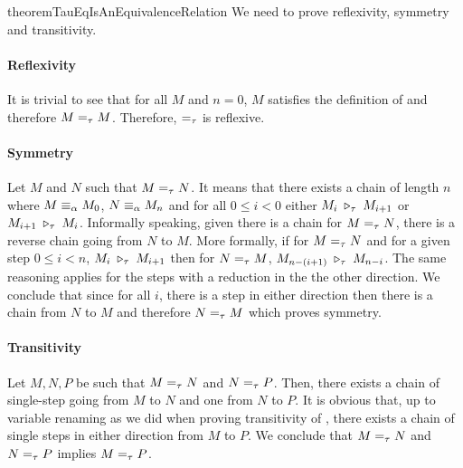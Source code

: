 \begin{longproof}{theoremTauEqIsAnEquivalenceRelation}
We need to prove reflexivity, symmetry and transitivity.

\paragraph{Reflexivity}
It is trivial to see that for all $M$ and $n=0$, $M$ satisfies the definition of \tauconversion and therefore $M =_\tau M$. Therefore, $=_\tau$ is reflexive.

\paragraph{Symmetry}
Let $M$ and $N$ such that $M =_\tau N$. It means that there exists a chain of length $n$ where $M \equiv_\alpha M_{0}$, $N \equiv_\alpha M_{n}$ and for all $0 \leq i < 0$ either $M_{i} \;\triangleright_\tau\; M_{i+1}$ or $M_{i+1} \;\triangleright_\tau\; M_{i}$. Informally speaking, given there is a chain for $M =_\tau N$, there is a reverse chain going from $N$ to $M$. More formally, if for $M =_\tau N$ and for a given step $0 \leq i < n$, $M_i \;\triangleright_\tau\; M_{i+1}$ then for $N =_\tau M$, $M_{n-(i+1)} \;\triangleright_\tau\; M_{n-i}$. The same reasoning applies for the steps with a reduction in the the other direction. We conclude that since for all $i$, there is a step in either direction then there is a chain from $N$ to $M$ and therefore $N =_\tau M$ which proves symmetry.

\paragraph{Transitivity}
Let $M, N, P$ be such that $M =_\tau N$ and $N =_\tau P$. Then, there exists a chain of single-step \taureduction going from $M$ to $N$ and one from $N$ to $P$. It is obvious that, up to variable renaming as we did when proving transitivity of \taureduction, there exists a chain of single steps in either direction from $M$ to $P$. We conclude that $M =_\tau N$ and $N =_\tau P$ implies $M =_\tau P$.
\end{longproof}



